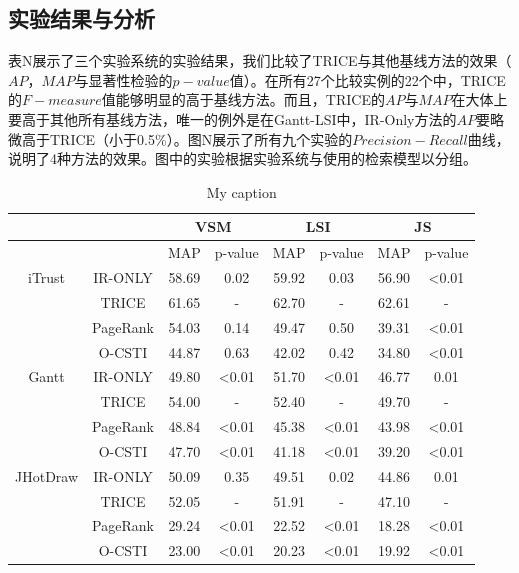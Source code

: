 \subsection{实验结果与分析}

表N展示了三个实验系统的实验结果，我们比较了TRICE与其他基线方法的效果（$AP$，$MAP$与显著性检验的$p-value$值）。在所有27个比较实例的22个中，TRICE的$F-measure$值能够明显的高于基线方法。而且，TRICE的$AP$与$MAP$在大体上要高于其他所有基线方法，唯一的例外是在Gantt-LSI中，IR-Only方法的$AP$要略微高于TRICE（小于0.5\%）。图N展示了所有九个实验的$Precision-Recall$曲线，说明了4种方法的效果。图中的实验根据实验系统与使用的检索模型以分组。


\begin{table}[]
\centering
\caption{My caption}
\label{my-label}
\begin{tabular}{@{}cccccccc@{}}
\toprule
         &          & \multicolumn{2}{c}{VSM} & \multicolumn{2}{c}{LSI} & \multicolumn{2}{c}{JS} \\ \midrule
         &          & MAP    & p-value        & MAP    & p-value        & MAP   & p-value        \\
iTrust   & IR-ONLY  & 58.69  & 0.02           & 59.92  & 0.03           & 56.90 & \textless 0.01 \\
         & TRICE    & 61.65  & -              & 62.70  & -              & 62.61 & -              \\
         & PageRank & 54.03  & 0.14           & 49.47  & 0.50           & 39.31 & \textless 0.01 \\
         & O-CSTI   & 44.87  & 0.63           & 42.02  & 0.42           & 34.80 & \textless 0.01 \\
Gantt    & IR-ONLY  & 49.80  & \textless 0.01 & 51.70  & \textless 0.01 & 46.77 & 0.01           \\
         & TRICE    & 54.00  & -              & 52.40  & -              & 49.70 & -              \\
         & PageRank & 48.84  & \textless 0.01 & 45.38  & \textless 0.01 & 43.98 & \textless 0.01 \\
         & O-CSTI   & 47.70  & \textless 0.01 & 41.18  & \textless 0.01 & 39.20 & \textless 0.01 \\
JHotDraw & IR-ONLY  & 50.09  & 0.35           & 49.51  & 0.02           & 44.86 & 0.01           \\
         & TRICE    & 52.05  & -              & 51.91  & -              & 47.10 & -              \\
         & PageRank & 29.24  & \textless 0.01 & 22.52  & \textless 0.01 & 18.28 & \textless 0.01 \\
         & O-CSTI   & 23.00  & \textless 0.01 & 20.23  & \textless 0.01 & 19.92 & \textless 0.01 \\ \bottomrule
\end{tabular}
\end{table}

